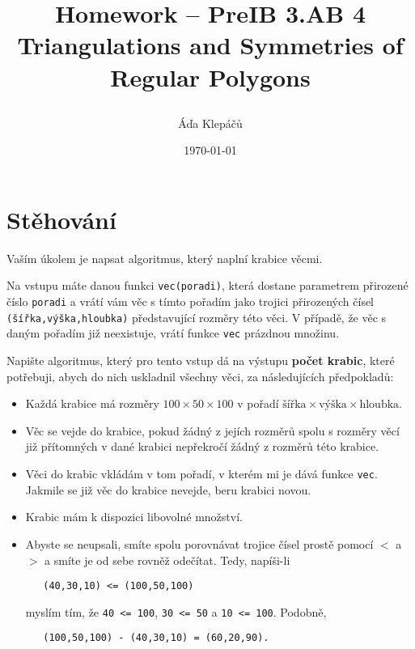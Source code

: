 \documentclass[a4paper,11pt]{article}
\title{\Huge\textsf{Homework -- PreIB 3.AB 4}\\
 \Large\textsf{Triangulations and Symmetries of Regular Polygons}
 \author{Áďa Klepáčů}
 \date{\today}
}
\begin{document}
\thispagestyle{fancy}

\section*{Stěhování}

Vaším úkolem je napsat algoritmus, který naplní krabice věcmi.

Na vstupu máte danou funkci \texttt{vec(poradi)}, která dostane parametrem
přirozené číslo \texttt{poradi} a vrátí vám věc s tímto pořadím jako trojici
přirozených čísel \texttt{(šířka,výška,hloubka)} představující rozměry této
věci. V případě, že věc s daným pořadím již neexistuje, vrátí funkce
\texttt{vec} prázdnou množinu.

Napište algoritmus, který pro tento vstup dá na výstupu \textbf{počet krabic},
které potřebuji, abych do nich uskladnil všechny věci, za následujících
předpokladů:
\begin{itemize}
 \item Každá krabice má rozměry $100 \times 50 \times 100$ v pořadí
  $\text{šířka} \times \text{výška} \times \text{hloubka}$.
 \item Věc se vejde do krabice, pokud žádný z jejích rozměrů spolu s rozměry
  věcí již přítomných v dané krabici nepřekročí žádný z rozměrů této krabice.
 \item Věci do krabic vkládám v tom pořadí, v kterém mi je dává funkce
  \texttt{vec}. Jakmi\-le se již věc do krabice nevejde, beru krabici novou.
 \item Krabic mám k dispozici libovolné množství.
 \item Abyste se neupsali, smíte spolu porovnávat trojice čísel prostě pomocí
  $<$ a $>$ a smíte je od sebe rovněž odečítat. Tedy, napíši-li
  \vspace*{-1em}
  \begin{verbatim}
   (40,30,10) <= (100,50,100)
  \end{verbatim}
  \vspace*{-2.3em}
  myslím tím, že \texttt{40 <= 100}, \texttt{30 <= 50} a \texttt{10 <= 100}.
  Podobně,
  \vspace*{-1em}
  \begin{verbatim}
   (100,50,100) - (40,30,10) = (60,20,90).
  \end{verbatim}
\end{itemize}
\end{document}
